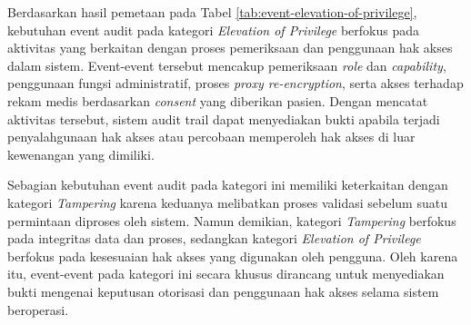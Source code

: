 Berdasarkan hasil pemetaan pada Tabel \ref{tab:event-elevation-of-privilege}, kebutuhan event audit pada kategori \textit{Elevation of Privilege} berfokus pada aktivitas yang berkaitan dengan proses pemeriksaan dan penggunaan hak akses dalam sistem. Event-event tersebut mencakup pemeriksaan \textit{role} dan \textit{capability}, penggunaan fungsi administratif, proses \textit{proxy re-encryption}, serta akses terhadap rekam medis berdasarkan \textit{consent} yang diberikan pasien. Dengan mencatat aktivitas tersebut, sistem audit trail dapat menyediakan bukti apabila terjadi penyalahgunaan hak akses atau percobaan memperoleh hak akses di luar kewenangan yang dimiliki.

Sebagian kebutuhan event audit pada kategori ini memiliki keterkaitan dengan kategori \textit{Tampering} karena keduanya melibatkan proses validasi sebelum suatu permintaan diproses oleh sistem. Namun demikian, kategori \textit{Tampering} berfokus pada integritas data dan proses, sedangkan kategori \textit{Elevation of Privilege} berfokus pada kesesuaian hak akses yang digunakan oleh pengguna. Oleh karena itu, event-event pada kategori ini secara khusus dirancang untuk menyediakan bukti mengenai keputusan otorisasi dan penggunaan hak akses selama sistem beroperasi.